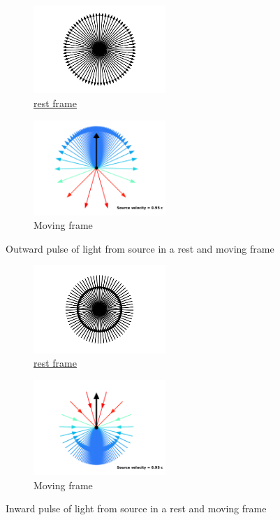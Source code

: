 \begin{figure}[htbp]
	\begin{subfigure}{.49\textwidth}
		\centering
		\includegraphics[width=5cm]{images/pdf/Rest_velocities.pdf}
		\caption{\hyperlink{def-proper-frame}{rest frame}}
	\end{subfigure}
	\begin{subfigure}{.49\textwidth}
		\centering
		\includegraphics[width=5cm]{images/pdf/Aberrated_velocities.pdf}
		\caption{Moving frame}
	\end{subfigure}
	\caption{Outward pulse of light from source in a rest and moving frame}
	\label{fig: outward pulse velocities}
\end{figure}

\begin{figure}[htbp]
	\begin{subfigure}{.49\textwidth}
		\centering
		\includegraphics[width=5cm]{images/pdf/Rest_velocities_inwards.pdf}
		\caption{\hyperlink{def-proper-frame}{rest frame}}
	\end{subfigure}
	\begin{subfigure}{.49\textwidth}
		\centering
		\includegraphics[width=5cm]{images/pdf/Aberrated_velocities_inwards.pdf}
		\caption{Moving frame}
	\end{subfigure}
	\caption{Inward pulse of light from source in a rest and moving frame}
	\label{fig: Relativistic Beaming}
\end{figure}

